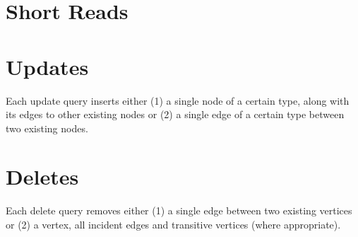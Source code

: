 
\section{Short Reads}
\label{sec:short-reads}










\section{Updates}
\label{sec:updates}

Each update query inserts either (1) a single node of a certain type, along with its edges to other existing nodes or (2) a single edge of a certain type between two existing nodes.










\section{Deletes}
\label{sec:deletes}

Each delete query removes either (1) a single edge between two existing vertices or (2) a vertex, all incident edges and transitive vertices (where appropriate). 

\renewcommand{\currentQueryCard}{0}
